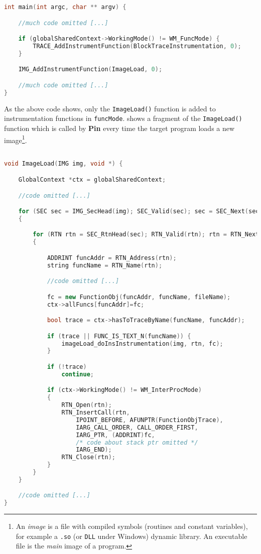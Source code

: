 \documentclass[a4paper,10pt]{report}
\begin{document}
\begin{lstlisting}[language=C++,
	caption={a fragment of main() routine},
	label=main1, frame=leftline]
int main(int argc, char ** argv) {

	//much code omitted [...]

	if (globalSharedContext->WorkingMode() != WM_FuncMode) {
		TRACE_AddInstrumentFunction(BlockTraceInstrumentation, 0);
	}

	IMG_AddInstrumentFunction(ImageLoad, 0);

	//much code omitted [...]
}

\end{lstlisting}

As the above code shows, only the \verb|ImageLoad()| function is added to instrumentation
functions in \verb|funcMode|.
 shows a fragment of the \verb|ImageLoad()| function which
is called by \textbf{Pin} every time the target program loads a new
image\footnote{An \emph{image} is a file with compiled symbols (routines and constant variables), for example a \texttt{.so} (or \texttt{DLL} under Windows) dynamic library.
An executable file is the \emph{main} image of a program.}.

\begin{lstlisting}[language=C++,
	caption={a fragment of ImageLoad() routine},
	label=imgload, frame=leftline]

void ImageLoad(IMG img, void *) {

	GlobalContext *ctx = globalSharedContext;

	//code omitted [...]

	for (SEC sec = IMG_SecHead(img); SEC_Valid(sec); sec = SEC_Next(sec))
	{

		for (RTN rtn = SEC_RtnHead(sec); RTN_Valid(rtn); rtn = RTN_Next(rtn))
		{

			ADDRINT funcAddr = RTN_Address(rtn);
			string funcName = RTN_Name(rtn);

			//code omitted [...]

			fc = new FunctionObj(funcAddr, funcName, fileName);
			ctx->allFuncs[funcAddr]=fc;

			bool trace = ctx->hasToTraceByName(funcName, funcAddr);

			if (trace || FUNC_IS_TEXT_N(funcName)) {
				imageLoad_doInsInstrumentation(img, rtn, fc);
			}

			if (!trace)
				continue;

			if (ctx->WorkingMode() != WM_InterProcMode)
			{
				RTN_Open(rtn);
				RTN_InsertCall(rtn,
					IPOINT_BEFORE, AFUNPTR(FunctionObjTrace),
					IARG_CALL_ORDER, CALL_ORDER_FIRST,
					IARG_PTR, (ADDRINT)fc,
					/* code about stack ptr omitted */
					IARG_END);
				RTN_Close(rtn);
			}
		}
	}

	//code omitted [...]
}

\end{lstlisting}
\end{document}
